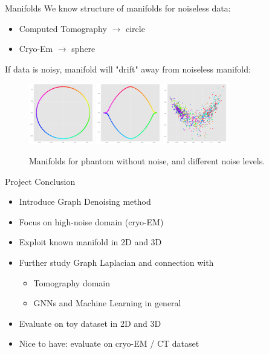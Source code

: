 \documentclass[aspectratio=169]{beamer}
\begin{document}
\begin{frame}[c]{Manifolds}
    We know structure of manifolds for noiseless data:
    \begin{itemize}
        \item Computed Tomography $\to$ circle
        \item Cryo-Em $\to$ sphere
    \end{itemize}

    If data is noisy, manifold will "drift" away from noiseless manifold:
    \begin{figure}
        \includegraphics[width=0.25\textwidth]{phantom_second_third_evec}
        \includegraphics[width=0.25\textwidth]{phantom_second_third_evec_noisy}
        \includegraphics[width=0.25\textwidth]{phantom_second_third_evec_noisy_high}
        \caption{Manifolds for phantom without noise, and different noise levels.}
    \end{figure}
\end{frame}


\begin{frame}{Project Conclusion}
    \begin{itemize}
        \item Introduce Graph Denoising method
        \item Focus on high-noise domain (cryo-EM)
        \item Exploit known manifold in 2D and 3D
        \item Further study Graph Laplacian and connection with
            \begin{itemize}
                \item Tomography domain
                \item GNNs and Machine Learning in general
            \end{itemize}
        \item Evaluate on toy dataset in 2D and 3D
        \item Nice to have: evaluate on cryo-EM / CT dataset
    \end{itemize}
\end{frame}
\end{document}
